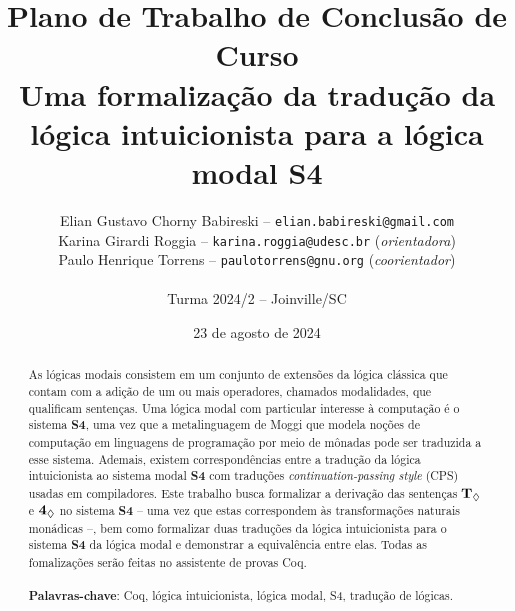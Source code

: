 \title{
Plano de Trabalho de Conclusão de Curso\\
Uma formalização da tradução da lógica intuicionista para a lógica modal S4
}

\author{
Elian Gustavo Chorny Babireski -- \texttt{elian.babireski@gmail.com}\\
Karina Girardi Roggia -- \texttt{karina.roggia@udesc.br} {(\textit{orientadora})}\\
Paulo Henrique Torrens -- \texttt{paulotorrens@gnu.org} {(\textit{coorientador})}\\
~\\
Turma 2024/2 -- Joinville/SC
}

\date{23 de agosto de 2024}

\maketitle

\onehalfspacing  %

\begin{abstract}
As lógicas modais consistem em um conjunto de extensões da lógica clássica que contam com a adição de um ou mais operadores, chamados modalidades, que qualificam sentenças. Uma lógica modal com particular interesse à computação é o sistema \textbf{S4}, uma vez que a metalinguagem de Moggi que modela noções de computação em linguagens de programação por meio de mônadas pode ser traduzida a esse sistema. Ademais, existem correspondências entre a tradução da lógica intuicionista ao sistema modal \textbf{S4} com traduções \textit{continuation-passing style} (CPS) usadas em compiladores. Este trabalho busca formalizar a derivação das sentenças $\boldsymbol{\text{\textbf{T}}_\Diamond}$ e $\boldsymbol{\text{\textbf{4}}_\Diamond}$ no sistema \textbf{S4} -- uma vez que estas correspondem às transformações naturais monádicas --, bem como formalizar duas traduções da lógica intuicionista para o sistema \textbf{S4} da lógica modal e demonstrar a equivalência entre elas. Todas as fomalizações serão feitas no assistente de provas Coq. \\\\
\textbf{Palavras-chave}: Coq, lógica intuicionista, lógica modal, S4, tradução de lógicas.
\end{abstract}